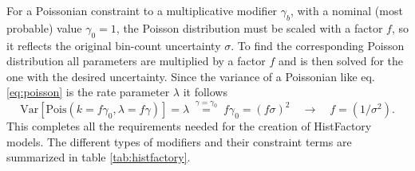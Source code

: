 For a Poissonian constraint to a multiplicative modifier $\gamma_b$, with a nominal (most probable) value $\gamma_0=1$, the Poisson distribution must be scaled with a factor $f$, so it reflects the original bin-count uncertainty $\sigma$. To find the corresponding Poisson distribution all parameters are multiplied by a factor $f$ and is then solved for the one with the desired uncertainty. Since the variance of a Poissonian like eq. \ref{eq:poisson} is  the rate parameter $\lambda$ it follows
\begin{equation}
    \mathrm{Var}\left[\mathrm{Pois}(k=f\gamma_0,\lambda=f\gamma)\right]=\lambda\;\stackrel{\gamma=\gamma_0}{=}\;f\gamma_0=(f\sigma)^2  \quad \rightarrow \quad f=(1/\sigma^2).
\end{equation}
This completes all the requirements needed for the creation of HistFactory models. The different types of modifiers and their constraint terms are summarized in table \ref{tab:histfactory}.
